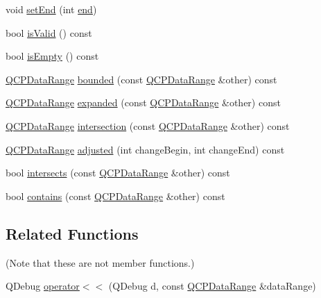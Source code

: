 \begin{DoxyCompactItemize}
void \mbox{\hyperlink{class_q_c_p_data_range_a277f1a9eafe70b9184d9c00b641ae5de}{set\+End}} (int \mbox{\hyperlink{class_q_c_p_data_range_aee1b20fb045929c3753ee2ce14af7630}{end}})
\item 
bool \mbox{\hyperlink{class_q_c_p_data_range_aae53a37472212dca0a7939963e20dba0}{is\+Valid}} () const
\item 
bool \mbox{\hyperlink{class_q_c_p_data_range_ac32e53fc05d6cd2eac96b96a7265d3b8}{is\+Empty}} () const
\item 
\mbox{\hyperlink{class_q_c_p_data_range}{Q\+C\+P\+Data\+Range}} \mbox{\hyperlink{class_q_c_p_data_range_a93529421d12fdd3a8bdb2b8061936352}{bounded}} (const \mbox{\hyperlink{class_q_c_p_data_range}{Q\+C\+P\+Data\+Range}} \&other) const
\item 
\mbox{\hyperlink{class_q_c_p_data_range}{Q\+C\+P\+Data\+Range}} \mbox{\hyperlink{class_q_c_p_data_range_a36c8ad8acf177ffeb0a72c8d73030844}{expanded}} (const \mbox{\hyperlink{class_q_c_p_data_range}{Q\+C\+P\+Data\+Range}} \&other) const
\item 
\mbox{\hyperlink{class_q_c_p_data_range}{Q\+C\+P\+Data\+Range}} \mbox{\hyperlink{class_q_c_p_data_range_a84e1e03129dd52528efb4bac18d30183}{intersection}} (const \mbox{\hyperlink{class_q_c_p_data_range}{Q\+C\+P\+Data\+Range}} \&other) const
\item 
\mbox{\hyperlink{class_q_c_p_data_range}{Q\+C\+P\+Data\+Range}} \mbox{\hyperlink{class_q_c_p_data_range_a279ed36602b39607699dc5652bcaf813}{adjusted}} (int change\+Begin, int change\+End) const
\item 
bool \mbox{\hyperlink{class_q_c_p_data_range_a8a1c437f9beffd55621f48f961d7f679}{intersects}} (const \mbox{\hyperlink{class_q_c_p_data_range}{Q\+C\+P\+Data\+Range}} \&other) const
\item 
bool \mbox{\hyperlink{class_q_c_p_data_range_a13ca398776374a3160aa85433718b812}{contains}} (const \mbox{\hyperlink{class_q_c_p_data_range}{Q\+C\+P\+Data\+Range}} \&other) const
\end{DoxyCompactItemize}
\subsection*{Related Functions}
(Note that these are not member functions.) \begin{DoxyCompactItemize}
\item 
Q\+Debug \mbox{\hyperlink{class_q_c_p_data_range_a486dd7af8a090ed069672e3510e6a082}{operator$<$$<$}} (Q\+Debug d, const \mbox{\hyperlink{class_q_c_p_data_range}{Q\+C\+P\+Data\+Range}} \&data\+Range)
\end{DoxyCompactItemize}


